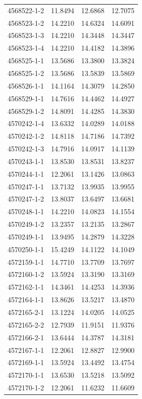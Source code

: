 \begin{longtable}{lrrr}
4568522-1-2 & 11.8494 & 12.6868 & 12.7075 \\
4568523-1-2 & 14.2210 & 14.6324 & 14.6091 \\
4568523-1-3 & 14.2210 & 14.3448 & 14.3447 \\
4568523-1-4 & 14.2210 & 14.4182 & 14.3896 \\
4568525-1-1 & 13.5686 & 13.3800 & 13.3824 \\
4568525-1-2 & 13.5686 & 13.5839 & 13.5869 \\
4568526-1-1 & 14.1164 & 14.3079 & 14.2850 \\
4568529-1-1 & 14.7616 & 14.4462 & 14.4927 \\
4568529-1-2 & 14.8091 & 14.4285 & 14.3830 \\
4570242-1-4 & 13.6332 & 14.0289 & 14.0188 \\
4570242-1-2 & 14.8118 & 14.7186 & 14.7392 \\
4570242-1-3 & 14.7916 & 14.0917 & 14.1139 \\
4570243-1-1 & 13.8530 & 13.8531 & 13.8237 \\
4570244-1-1 & 12.2061 & 13.1426 & 13.0863 \\
4570247-1-1 & 13.7132 & 13.9935 & 13.9955 \\
4570247-1-2 & 13.8037 & 13.6497 & 13.6681 \\
4570248-1-1 & 14.2210 & 14.0823 & 14.1554 \\
4570249-1-2 & 13.2357 & 13.2135 & 13.2867 \\
4570249-1-1 & 13.9495 & 14.2879 & 14.3228 \\
4570250-1-1 & 15.4249 & 14.1122 & 14.1049 \\
4572159-1-1 & 14.7710 & 13.7709 & 13.7697 \\
4572160-1-2 & 13.5924 & 13.3190 & 13.3169 \\
4572162-1-1 & 14.3461 & 14.4253 & 14.3936 \\
4572164-1-1 & 13.8626 & 13.5217 & 13.4870 \\
4572165-2-1 & 13.1224 & 14.0205 & 14.0525 \\
4572165-2-2 & 12.7939 & 11.9151 & 11.9376 \\
4572166-2-1 & 13.6444 & 14.3787 & 14.3181 \\
4572167-1-1 & 12.2061 & 12.8827 & 12.9900 \\
4572169-1-1 & 13.5924 & 13.4492 & 13.4754 \\
4572170-1-1 & 13.6530 & 13.5218 & 13.5092 \\
4572170-1-2 & 12.2061 & 11.6232 & 11.6609 \\

\end{longtable}
